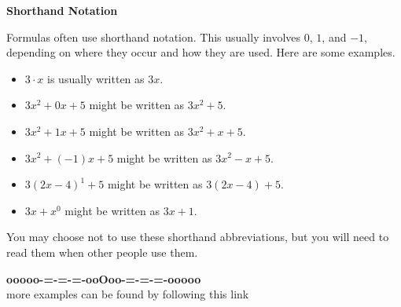 \documentclass{ximera}
\begin{document}
\begin{warning} \textbf{\textcolor{red!70!darkgray}{Shorthand Notation}}  


Formulas often use shorthand notation.  This usually involves $0$, $1$, and $-1$, depending on where they occur and how they are used.  Here are some examples.


\begin{itemize}
\item $3 \cdot x$ is usually written as $3x$.
\item $3x^2 + 0 x + 5$  might be written as $3x^2 + 5$.
\item $3x^2 + 1 x + 5$  might be written as $3x^2 + x + 5$.
\item $3x^2 + (-1) x + 5$  might be written as $3x^2 - x + 5$.
\item $3(2x-4)^1 + 5$  might be written as $3(2x-4) + 5$.
\item $3x + x^0$  might be written as $3x + 1$.
\end{itemize}


You may choose not to use these shorthand abbreviations, but you will need to read them when other people use them.

\end{warning}
















\begin{onlineOnly}
\begin{center}
\textbf{\textcolor{green!50!black}{ooooo-=-=-=-ooOoo-=-=-=-ooooo}} \\

more examples can be found by following this link\\ 

\end{center}
\end{onlineOnly}
\end{document}
